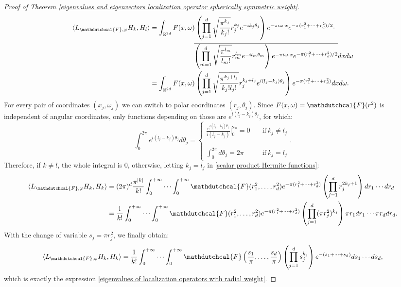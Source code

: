 \documentclass[corpo=11pt, stile=classica, tipotesi=custom,
greek, evenboxes, english]{toptesi}
\numberwithin{equation}{chapter}
\theoremstyle{definition}
\theoremstyle{remark}
\newcommand{\R}{\mathbb{R}} %
\begin{document}
\begin{proof}[Proof of Theorem \ref{eigenvalues and eigenvectors localization operator spherically symmetric weight}]
	\begin{align}
		\langle  L_{\mathdutchcal{F},\varphi}H_k,H_l\rangle &= \int_{\R^{2d}} F(x,\omega) \left(\prod_{j=1}^d \sqrt{\dfrac{\pi^{k_j}}{k_j!}} r_j^{k_j}e^{-i k_j \theta_j}\right)e^{-\pi i \omega \cdot x} e^{-\pi(r_1^2 + \cdots + r_d^2)/2} \cdot \nonumber\\
															&\hphantom{=\int_{\R^{2d}} F(x,\omega)} \,\overline{\left(\prod_{m=1}^d \sqrt{\dfrac{\pi^{l_m}}{l_m!}} r_m^{l_m}e^{-i l_m \theta_m}\right)e^{-\pi i \omega \cdot x} e^{-\pi(r_1^2 + \cdots + r_d^2)/2}}dxd\omega \nonumber\\
															&=\int_{\R^{2d}} F(x,\omega) \left(\prod_{j=1}^d \sqrt{\dfrac{\pi^{k_j + l_j}}{k_j!l_j!}} r_j^{k_j + l_j} e^{i(l_j - k_j)\theta_j} \right) e^{-\pi(r_1^2 + \cdots + r_d^2)}dxd\omega. \label{scalar product Hermite functions}
	\end{align}
	For every pair of coordinates $(x_j,\omega_j)$ we can switch to polar coordinates $(r_j,\theta_j)$. Since $F(x,\omega) = \mathdutchcal{F}(r^2)$ is independent of angular coordinates, only functions depending on those are $e^{i(l_j - k_j)\theta_j}$, for which:
	\begin{equation*}
		\int_0^{2\pi} e^{i(l_j - k_j)\theta_j}d\theta_j = \begin{cases}
			\displaystyle \frac{e^{i(l_j - k_j)\theta_j}}{i(l_j - k_j)} \bigg\rvert_0^{2\pi}=0 \quad & \mathrm{if\ } k_j \neq l_j\\
			\phantom{a}\\
			\displaystyle \int_0^{2\pi} d\theta_j = 2\pi \quad &\mathrm{if\ } k_j=l_j
		\end{cases}.
	\end{equation*}
	Therefore, if $k \neq l$, the whole integral is 0, otherwise, letting $k_j = l_j$ in \eqref{scalar product Hermite functions}:
	\begin{align*}
		\langle  L_{\mathdutchcal{F},\varphi}H_k,H_k\rangle &= (2\pi)^d \dfrac{\pi^{|k|}}{k!}\int_0^{+\infty} {\cdots} \int_0^{+\infty} \mathdutchcal{F}(r_1^2,\ldots,r_d^2) e^{-\pi(r_1^2 + \cdots + r_d^2)}\left(\prod_{j=1}^{d} r_j^{2k_j + 1} \right) dr_1 \cdots dr_d \\
															&= \dfrac{1}{k!} \int_0^{+\infty} \cdots \int_0^{+\infty} \mathdutchcal{F}(r_1^2,\ldots,r_d^2) e^{-\pi(r_1^2 + \cdots + r_d^2)} \left(\prod_{j=1}^{d} (\pi r_j^2)^{k_j} \right) \pi r_1 dr_1 \cdots \pi r_d dr_d.
	\end{align*}
	With the change of variable $s_j = \pi r_j^2$, we finally obtain:
	\begin{equation*}
		\langle  L_{\mathdutchcal{F},\varphi}H_k,H_k\rangle = \dfrac{1}{k!} \int_0^{+\infty} \cdots \int_0^{+\infty} \mathdutchcal{F}\left(\frac{s_1}{\pi},\ldots,\frac{s_d}{\pi}\right) \left(\prod_{j=1}^{d} s_j^{k_j} \right) e^{-(s_1 + \cdots + s_d)} ds_1 \cdots ds_d,
	\end{equation*}
	which is exactly the expression \eqref{eigenvalues of localization operators with radial weight}.
\end{proof}
\end{document}
